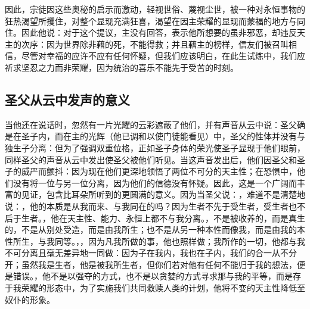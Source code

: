 因此，宗徒因这些奥秘的启示而激动，轻视世俗、蔑视尘世，被一种对永恒事物的狂热渴望所攫住，对整个显现充满狂喜，渴望在因主荣耀的显现而蒙福的地方与同住。因此他说：对于这个提议，主没有回答，表示他所想要的虽非邪恶，却违反天主的次序：因为世界除非藉的死，不能得救；并且藉主的榜样，信友们被召叫相信，尽管对幸福的应许不应有任何怀疑，但我们应该明白，在此生试炼中，我们应祈求坚忍之力而非荣耀，因为统治的喜乐不能先于受苦的时刻。\par


\subsection{圣父从云中发声的意义}

当他还在说话时，忽然有一片光耀的云彩遮蔽了他们，并有声音从云中说：圣父确是在圣子内，而在主的光辉（他已调和以使门徒能看见）中，圣父的性体并没有与独生子分离：但为了强调双重位格，正如圣子身体的荣光使圣子显现于他们眼前，同样圣父的声音从云中发出使圣父被他们听见。当这声音发出后，他们因圣父和圣子的威严而颤抖：因为现在他们更深地领悟了两位不可分的天主性；在恐惧中，他们没有将一位与另一位分离，因为他们的信德没有怀疑。因此，这是一个广阔而丰富的见证，包含比耳朵所听到的更圆满的意义。因为当圣父说：，难道不是清楚地说：，他的本质是从我而来、与我同在的吗？因为生者不先于受生者，受生者也不后于生者。，他在天主性、能力、永恒上都不与我分离。，不是被收养的，而是真生的，不是从别处受造，而是由我所生；也不是从另一种本性而像我，而是由我的本性所生，与我同等。，，因为凡我所做的事，他也照样做；我所作的一切，他都与我不可分离且毫无差异地一同做：因为子在我内，我也在子内，我们的合一从不分开；虽然我是生者，他是被我所生者，但你们若对他有任何不能归于我的想法，便是错误。，他不是以强夺的方式，也不是以贪婪的方式寻求那与我的平等，而是存于我荣耀的形态中，为了实施我们共同救赎人类的计划，他将不变的天主性降低至奴仆的形象。\par



